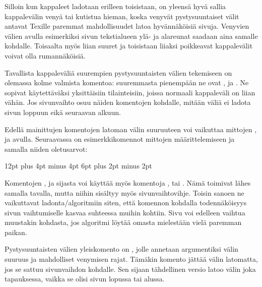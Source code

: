 \begin{koodilohkosis}
  \setlength{\parskip}{1.3ex plus .2ex minus .1ex}
\end{koodilohkosis}

Silloin kun kappaleet ladotaan erilleen toisistaan, on yleensä hyvä
sallia kappalevälin venyä tai kutistua hieman, koska venyvät
pystysuuntaiset välit antavat Texille paremmat mahdollisuudet latoa
hyvännäköisiä sivuja. Venyvien välien avulla esimerkiksi sivun
tekstialueen ylä- ja alareunat saadaan aina samalle kohdalle. Toisaalta
myös liian suuret ja toisistaan liiaksi poikkeavat kappalevälit voivat
olla rumannäköisiä.

Tavallista kappaleväliä suurempien pystysuuntaisten välien tekemiseen on
olemassa kolme valmista komentoa: suuremmasta pienempään ne ovat
,  ja . Ne
sopivat käytettäväksi yksittäisiin tilainteisiin, joissa normaali
kappaleväli on liian vähän. Jos sivunvaihto osuu näiden komentojen
kohdalle, mitään väliä ei ladota sivun loppuun eikä seuraavan alkuun.

Edellä mainittujen komentojen latoman välin suuruuteen voi vaikuttaa
mittojen ,  ja
 avulla. Seuraavassa on esimerkkikomennot
mittojen määrittelemiseen ja samalla niiden oletusarvot:

\begin{koodilohkosis}
  \setlength{\bigskipamount} {12pt plus 4pt minus 4pt}
  \setlength{\medskipamount}  {6pt plus 2pt minus 2pt}
  \setlength{\smallskipamount}{3pt plus 1pt minus 1pt}
\end{koodilohkosis}

Komentojen ,  ja 
sijasta voi käyttää myös komentoja ,
 tai . Nämä toimivat lähes
samalla tavalla, mutta niihin sisältyy myös sivunvaihtovihje. Toisin
sanoen ne vaikuttavat ladonta\-/algoritmiin siten, että komennon
kohdalla todennäköisyys sivun vaihtumiselle kasvaa suhteessa muihin
kohtiin. Sivu voi edelleen vaihtua muustakin kohdasta, jos algoritmi
löytää omasta mielestään vielä paremman paikan.

Pystysuuntaisten välien yleiskomento on , jolle
annetaan argumentiksi välin suuruus ja mahdolliset venymisen rajat.
Tämäkin komento jättää välin latomatta, jos se sattuu sivunvaihdon
kohdalle. Sen sijaan tähdellinen versio  latoo välin
joka tapauksessa, vaikka se olisi sivun lopussa tai alussa.

